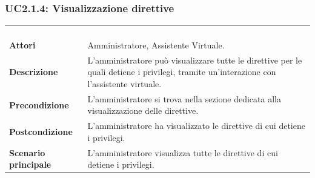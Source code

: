 \subsubsection{UC2.1.4: Visualizzazione direttive }
\label{UC2.1.4}
\begin{longtable}{l|p{10cm}}
\rowcolor[gray]{0.8} \multicolumn{2}{c}{} \\
\rowcolor[gray]{0.8} \multicolumn{2}{c}{\textbf{UC2.1.4 - Visualizzazione direttive }} \\
\rowcolor[gray]{0.8} \multicolumn{2}{c}{} \\
\hline
&\\
\textbf{Attori} & Amministratore, Assistente Virtuale.\\[7pt]
\textbf{Descrizione} & L'amministratore può visualizzare tutte le direttive per le quali detiene i privilegi, tramite un'interazione con l'assistente virtuale.\\[7pt]
\textbf{Precondizione} & L'amministratore si trova nella sezione dedicata alla visualizzazione delle direttive.\\[7pt]
\textbf{Postcondizione} & L'amministratore ha visualizzato le direttive di cui detiene i privilegi.\\[7pt]
\textbf{Scenario principale} &L'amministratore visualizza tutte le direttive di cui detiene i privilegi.\\[7pt]\hline
\end{longtable}

